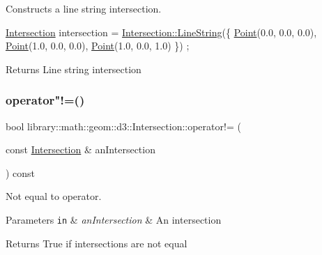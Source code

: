 Constructs a line string intersection. 


\begin{DoxyCode}
\hyperlink{classlibrary_1_1math_1_1geom_1_1d3_1_1_intersection_afbaef540a058ccc7e58f1be2585304a9}{Intersection} intersection = \hyperlink{classlibrary_1_1math_1_1geom_1_1d3_1_1_intersection_aa546d0185512a4c093a705a4c96f8960}{Intersection::LineString}(\{ 
      \hyperlink{classlibrary_1_1math_1_1geom_1_1d3_1_1_intersection_a5155cc245bd2bf96a4296b0a8319c709}{Point}(0.0, 0.0, 0.0), \hyperlink{classlibrary_1_1math_1_1geom_1_1d3_1_1_intersection_a5155cc245bd2bf96a4296b0a8319c709}{Point}(1.0, 0.0, 0.0), \hyperlink{classlibrary_1_1math_1_1geom_1_1d3_1_1_intersection_a5155cc245bd2bf96a4296b0a8319c709}{Point}(1.0, 0.0, 1.0) \}) ;
\end{DoxyCode}


\begin{DoxyReturn}{Returns}
Line string intersection 
\end{DoxyReturn}
\mbox{\label{classlibrary_1_1math_1_1geom_1_1d3_1_1_intersection_a8e3e47ed63f5c539cc39625b512c4b9e}} 
\subsubsection{\texorpdfstring{operator"!=()}{operator!=()}}
{\footnotesize\ttfamily bool library\+::math\+::geom\+::d3\+::\+Intersection\+::operator!= (\begin{DoxyParamCaption}\item[{const \hyperlink{classlibrary_1_1math_1_1geom_1_1d3_1_1_intersection}{Intersection} \&}]{an\+Intersection }\end{DoxyParamCaption}) const}



Not equal to operator. 


\begin{DoxyParams}[1]{Parameters}
\mbox{\tt in}  & {\em an\+Intersection} & An intersection \\
\hline
\end{DoxyParams}
\begin{DoxyReturn}{Returns}
True if intersections are not equal 
\end{DoxyReturn}
\mbox{\label{classlibrary_1_1math_1_1geom_1_1d3_1_1_intersection_a2b71d1b2a6429a893a8737a4d02c2da6}} 
